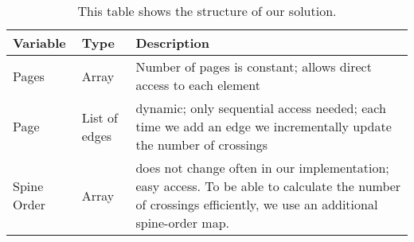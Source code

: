 \begin{table}
\centering
\begin{tabular}{llp{7cm}}
\toprule
\textbf{Variable} & \textbf{Type} & \textbf{Description} \\
\midrule
Pages & Array & Number of pages is constant; allows direct access to each element \\
Page & List of edges & dynamic; only sequential access needed; each time we add an edge we incrementally update the number of crossings \\
Spine Order & Array & does not change often in our implementation; easy access. To be able to calculate
the number of crossings efficiently, we use an additional spine-order map.\\

\bottomrule 

\end{tabular}

\caption{This table shows the structure of our solution.}
\label{tab:sol}
\end{table}









              

